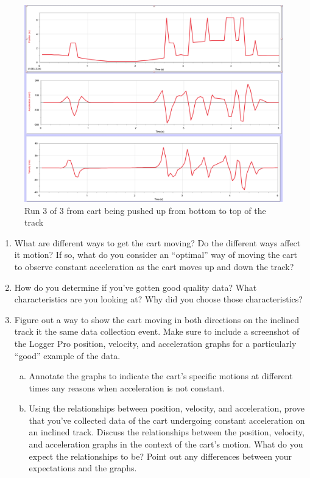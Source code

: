 \documentclass[idxtotoc,hyperref,openany]{labbook} %
\begin{document}
\begin{figure}[H] %
\begin{center}
\includegraphics[width=1\linewidth]{images/Lab.02/PushUp3.png}
\end{center}
\caption{Run 3 of 3 from cart being pushed up from bottom to top of the track}
\label{fig:Data of Cart PushUp3}
\end{figure}


\begin{enumerate}
    \item What are different ways to get the cart moving? Do the different ways affect it motion? If so, what do you consider an “optimal” way of moving the cart to observe constant acceleration as the cart moves up and down the track?
    \item How do you determine if you’ve gotten good quality data? What characteristics are you looking at? Why did you choose those characteristics?
    \item Figure out a way to show the cart moving in both directions on the inclined track it the same data collection event. Make sure to include a screenshot of the Logger Pro position, velocity, and acceleration graphs for a particularly “good” example of the data.
    \begin{enumerate}[(a)]
        \item Annotate the graphs to indicate the cart’s specific motions at different times any reasons when acceleration is not constant.
        \item Using the relationships between position, velocity, and acceleration, prove that you’ve collected data of the cart undergoing constant acceleration on an inclined track. Discuss the relationships between the position, velocity, and acceleration graphs in the context of the cart’s motion. What do you expect the relationships to be? Point out any differences between your expectations and the graphs.
    \end{enumerate}
\end{enumerate}
\end{document}
